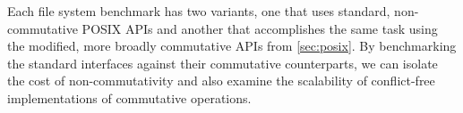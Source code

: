 


Each file system benchmark has
two variants, one that uses standard, non-commutative POSIX APIs and
another that accomplishes the same task using the modified, more broadly
commutative APIs from \cref{sec:posix}.
%
By benchmarking the standard interfaces against
their commutative counterparts, we can isolate the cost of
non-commutativity and also examine the scalability of
conflict-free implementations of commutative operations.


